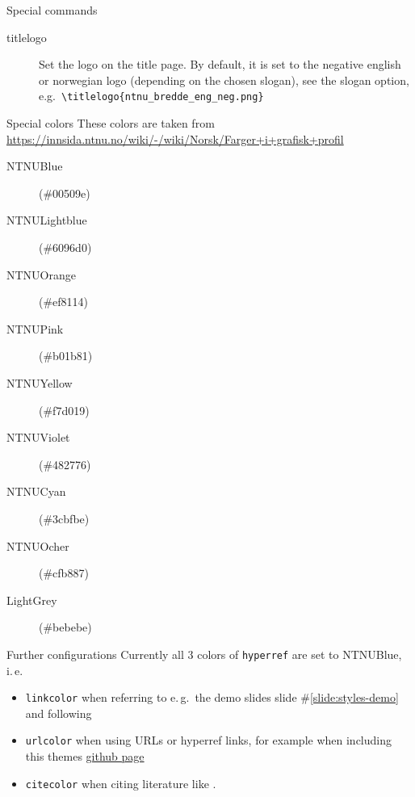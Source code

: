 \documentclass[aspectratio=169]{beamer}
\begin{document}
		\begin{frame}[fragile]{Special commands}
			\begin{description}
				\item[titlelogo]
				Set the logo on the title page. By default, it is set to the negative english or norwegian logo (depending on the chosen slogan), see the slogan option, e.g.\,
				\lstinline!\titlelogo{ntnu_bredde_eng_neg.png}!
			\end{description}
		\end{frame}
		
		\begin{frame}{Special colors}
	 		These colors are taken from \url{https://innsida.ntnu.no/wiki/-/wiki/Norsk/Farger+i+grafisk+profil}
			\begin{description}
				\item[{\color{NTNUBlue} NTNUBlue}] (\#{\color{NTNUBlue}00509e})
				\item[{\color{NTNULightblue} NTNULightblue}] (\#{\color{NTNULightblue}6096d0})
				\item[{\color{NTNUOrange} NTNUOrange}] (\#{\color{NTNUOrange}ef8114})
				\item[{\color{NTNUPink} NTNUPink}] (\#{\color{NTNUPink}b01b81})
				\item[{\color{NTNUYellow} NTNUYellow}] (\#{\color{NTNUYellow}f7d019})
				\item[{\color{NTNUViolet} NTNUViolet}] (\#{\color{NTNUViolet}482776})
				\item[{\color{NTNUCyan} NTNUCyan}] (\#{\color{NTNUCyan}3cbfbe})
				\item[{\color{NTNUOcher} NTNUOcher}] (\#{\color{NTNUOcher}cfb887})
				\item[{\color{LightGrey} LightGrey}] (\#{\color{LightGrey}bebebe})
			\end{description}
		\end{frame}
		
		\begin{frame}{Further configurations}
			Currently all 3 colors of \lstinline!hyperref! are set to {\color{NTNUBlue} NTNUBlue}, i.\,e.\
			\begin{itemize}
				\item \lstinline!linkcolor! when referring to e.\,g.\ the demo slides slide \#\ref{slide:styles-demo} and following
				\item \lstinline!urlcolor! when using URLs or hyperref links, for example when including this themes \href{https://github.com/ntnu-tex/beamerthementnu}{github page}
				\item \lstinline!citecolor! when citing literature like \footfullcite{TeX-book}.
			\end{itemize}
		\end{frame}
		
\end{document}
